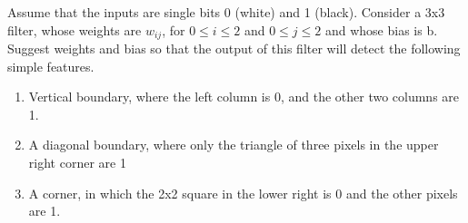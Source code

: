 \documentclass[10pt, a4paper]{article}
\begin{document}
\newpage
\subsubsection*{}
\begin{Problem}
    Assume that the inputs are single bits 0 (white) and 1 (black). Consider a 3x3
    filter, whose weights are \(w_{ij}\), for \(0 \leq i \leq 2\) and \(0 \leq j \leq 2\) and whose bias
    is b. Suggest weights and bias so that the output of this filter will detect the
    following simple features.
    \begin{enumerate}[label=\textbf{(\alph*)}]
        \item Vertical boundary, where the left column is 0, and the other two columns are 1.
        \item A diagonal boundary, where only the triangle of three pixels in the upper right corner are 1
        \item A corner, in which the 2x2 square in the lower right is 0 and the other pixels \\ are 1.
    \end{enumerate}
\end{Problem}
\end{document}
